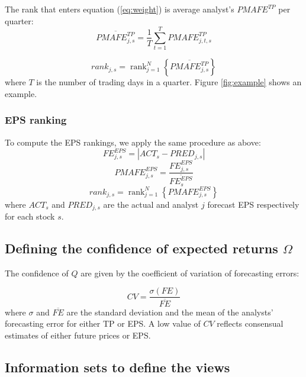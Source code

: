 \documentclass{book}
\DeclareMathOperator{\rank}{rank}
\begin{document}
The rank  that enters equation (\ref{eq:weight}) is average analyst's $PMAFE^{TP}$ per quarter:
\begin{equation}
\overline{PMAFE_{j,s}^{TP}}=\frac{1}{T} \sum_{t=1}^{T} PMAFE_{j,t,s}^{TP}
\end{equation}

\begin{equation}
\label{tp:rank}
rank_{j,s}=\rank_{j=1}^{N} \left\{ \overline{PMAFE_{j,s}^{TP}} \right\}
\end{equation}
where $T$ is the number of trading days in a quarter. Figure \ref{fig:example} shows an example.


\subsubsection{EPS ranking} 
To compute the EPS rankings, we apply the same procedure as above:
\begin{equation}
FE_{j,s}^{EPS}=|{ACT_{s}-PRED_{j,s}}|
\end{equation}
\begin{equation}
PMAFE_{j,s}^{EPS}= \frac{FE_{j,s}^{EPS}}{\overline{FE_{s}^{EPS}}}
\end{equation}
\begin{equation}
\label{eps:rank}
rank_{j,s}=\rank_{j=1}^{N} \left\{ PMAFE_{j,s}^{EPS} \right\} 
\end{equation}
where $ACT_{s}$ and $PRED_{j,s}$ are the actual and  analyst $j$ forecast EPS respectively for each stock $s$.


\subsection{Defining the confidence of expected returns $\Omega$}
\label{def-omega}
The confidence of $Q$ are given by the coefficient of variation of forecasting errors:

\begin{equation}
CV = \frac{\sigma (FE)}{\overline{FE}}
\end{equation}
where $\sigma$ and $\overline{FE}$ are the standard deviation and the mean of the analysts' forecasting error for either TP or EPS. A low value of $CV$ reflects consensual estimates of either future prices or EPS.



\subsection{Information sets to define the views}
\end{document}
